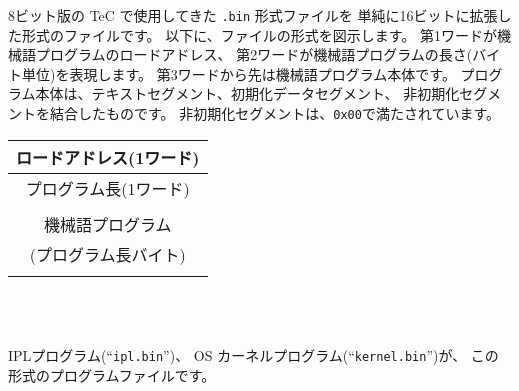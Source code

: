 8ビット版の TeC で使用してきた {\tt .bin} 形式ファイルを
単純に16ビットに拡張した形式のファイルです。
以下に、ファイルの形式を図示します。
第1ワードが機械語プログラムのロードアドレス、
第2ワードが機械語プログラムの長さ(バイト単位)を表現します。
第3ワードから先は機械語プログラム本体です。
プログラム本体は、テキストセグメント、初期化データセグメント、
非初期化セグメントを結合したものです。
非初期化セグメントは、\verb/0x00/で満たされています。

\begin{myminipage}
\begin{tabular}{|c|}
\hline
ロードアドレス(1ワード) \\
\hline
プログラム長(1ワード) \\
\hline
\\
機械語プログラム \\
(プログラム長バイト)\\
\\
\hline
\end{tabular}
\\ \\
\end{myminipage}

IPLプログラム(``{\tt ipl.bin}'')、
OS カーネルプログラム(``{\tt kernel.bin}'')が、
この形式のプログラムファイルです。
